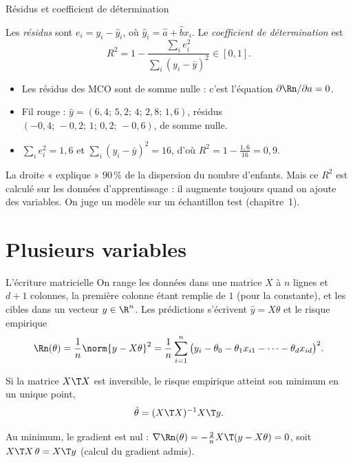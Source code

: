 \documentclass[aspectratio=169,11pt]{beamer}
\begin{document}
\begin{frame}{Résidus et coefficient de détermination}
  \begin{definition}[Résidus, $R^2$]
    Les \emph{résidus} sont $e_i=y_i-\hat y_i$, où $\hat y_i=\hat a+\hat bx_i$. Le \emph{coefficient de détermination} est
    \[
      R^2=1-\frac{\sum_ie_i^2}{\sum_i(y_i-\bar y)^2}\in[0,1].
    \]
  \end{definition}
  \small
  \begin{itemize}
    \item Les résidus des MCO sont de somme nulle : c'est l'équation $\partial\Rn/\partial a=0$.
    \item Fil rouge : $\hat y=(6{,}4;\,5{,}2;\,4;\,2{,}8;\,1{,}6)$, résidus $(-0{,}4;\,-0{,}2;\,1;\,0{,}2;\,-0{,}6)$, de somme nulle.
    \item $\sum_ie_i^2=1{,}6$ et $\sum_i(y_i-\bar y)^2=16$, d'où $R^2=1-\frac{1{,}6}{16}=0{,}9$.
  \end{itemize}
  \begin{remarque}
    La droite « explique » $90\,\%$ de la dispersion du nombre d'enfants. Mais ce $R^2$ est calculé sur les données d'apprentissage : il augmente toujours quand on ajoute des variables. On juge un modèle sur un échantillon test (chapitre~1).
  \end{remarque}
\end{frame}

\section{Plusieurs variables}

\begin{frame}{L'écriture matricielle}
  On range les données dans une matrice $X$ à $n$ lignes et $d+1$ colonnes, la première colonne étant remplie de $1$ (pour la constante), et les cibles dans un vecteur $y\in\R^n$.
  Les prédictions s'écrivent $\hat y=X\theta$ et le risque empirique
  \[
    \Rn(\theta)=\frac1n\norm{y-X\theta}^2=\frac1n\sum_{i=1}^n\big(y_i-\theta_0-\theta_1x_{i1}-\dots-\theta_dx_{id}\big)^2 .
  \]
  \begin{theoreme}
    Si la matrice $X\T X$ est inversible, le risque empirique atteint son minimum en un unique point,
    \[
      \hat\theta=(X\T X)^{-1}X\T y .
    \]
  \end{theoreme}
  \begin{preuve}[(idée)]
    Au minimum, le gradient est nul : $\nabla\Rn(\theta)=-\frac2nX\T(y-X\theta)=0$, soit $X\T X\,\theta=X\T y$ (calcul du gradient admis).
  \end{preuve}
\end{frame}
\end{document}
